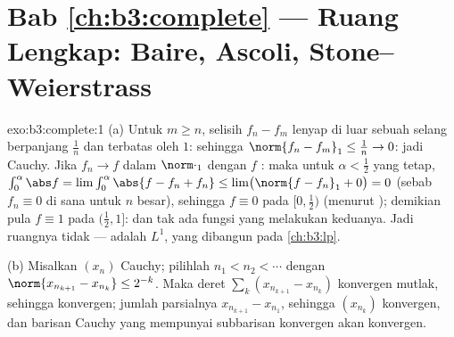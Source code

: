 \section*{Bab \ref{ch:b3:complete} --- Ruang Lengkap:
Baire, Ascoli, Stone--Weierstrass}

\begin{solution}{exo:b3:complete:1}
(a) Untuk $m \geq n$, selisih $f_n - f_m$ lenyap di luar sebuah selang
berpanjang $\frac1n$ dan terbatas oleh $1$: sehingga $\norm{f_n - f_m}_1
\leq \frac1n \to 0$: jadi Cauchy. Jika $f_n \to f$ dalam
$\norm\cdot_1$ dengan $f$ : maka untuk $\alpha <
\frac12$ yang tetap, $\int_0^{\alpha}\abs f = \lim \int_0^\alpha\abs{f -
f_n + f_n} \leq \lim\bigl(\norm{f - f_n}_1 + 0\bigr) = 0$
(sebab $f_n \equiv 0$ di sana untuk $n$ besar), sehingga $f \equiv 0$ pada
$[0, \frac12)$ (menurut ); demikian pula $f \equiv 1$ pada
$(\frac12, 1]$: dan tak ada fungsi  yang melakukan keduanya. Jadi ruangnya
tidak  ---  adalah $L^1$, yang dibangun pada
\cref{ch:b3:lp}.

(b) Misalkan $(x_n)$ Cauchy; pilihlah $n_1 < n_2 < \cdots$ dengan
$\norm{x_{n_{k+1}} - x_{n_k}} \leq 2^{-k}$. Maka deret
$\sum_k (x_{n_{k+1}} - x_{n_k})$ konvergen mutlak, sehingga
konvergen; jumlah parsialnya $x_{n_{k+1}} - x_{n_1}$, sehingga
$(x_{n_k})$ konvergen, dan barisan Cauchy yang mempunyai subbarisan
konvergen akan konvergen.
\end{solution}

